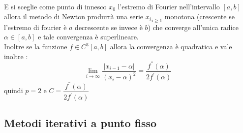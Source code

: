 \documentclass[12pt, a4paper]{book}
\theoremstyle{definition}
\begin{document}
\begin{flushleft}
E si sceglie come punto di innesco $x_{0}$ l'estremo di Fourier nell'intervallo $[a,b]$ allora il metodo di Newton produrrà una serie ${x_{i}}_{i \geq 1}$ monotona (crescente se l'estremo di fourier è $a$ decrescente se invece è $b$) che converge all'unica radice $\alpha \in [a,b]$ e tale convergenza è superlineare.\\
\vspace{1em}
Inoltre se la funzione $f \in C^{3}[a,b]$  allora la convergenza è quadratica e vale inoltre : 
\[ 
	\lim_{i \rightarrow \infty} \frac{|x_{i-1} - \alpha|}{(x_{i} - \alpha)^{2}} = \dfrac{f^{''}(\alpha)}{2f^{'}(\alpha)}
\]
quindi $p = 2$ e $C = \dfrac{f^{''}(\alpha)}{2f^{'}(\alpha)}$
\end{flushleft}

\subsection{ Metodi iterativi a punto fisso}
\end{document}

